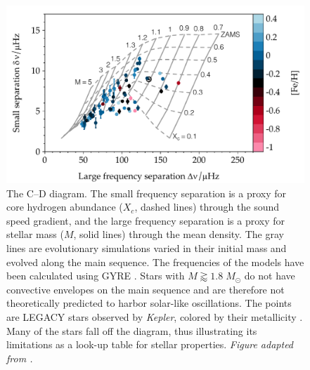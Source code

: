 \begin{figure}
    \centering
    \includegraphics[width=\textwidth]{figs/pulse/CD.pdf}%
    \caption[C--D Diagram]{The C--D diagram. 
    The small frequency separation is a proxy for core hydrogen abundance ($X_c$, dashed lines) through the sound speed gradient, and the large frequency separation is a proxy for stellar mass ($M$, solid lines) through the mean density. 
    The gray lines are evolutionary simulations varied in their initial mass and evolved along the main sequence. 
    The frequencies of the models have been calculated using GYRE \citep{2013MNRAS.435.3406T}. 
    Stars with ${M \gtrapprox 1.8\;M_{\odot}}$ do not have convective envelopes on the main sequence and are therefore not theoretically predicted to harbor solar-like oscillations. 
    The points are LEGACY stars observed by \emph{Kepler}, colored by their metallicity \citep{2017ApJ...835..172L}. 
    Many of the stars fall off the diagram, thus illustrating its limitations as a look-up table for stellar properties. 
    \emph{Figure adapted from \citealt{2017EPJWC.16005003B}.} 
    \label{fig:jcd}} 
\end{figure}
